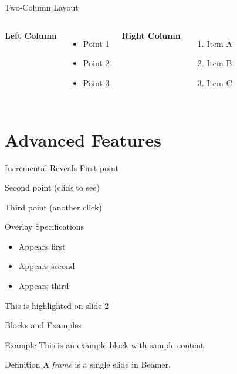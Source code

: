 \documentclass{beamer}
\begin{document}
\begin{frame}{Two-Column Layout}
  \begin{columns}
      \textbf{Left Column}
      \begin{itemize}
        \item Point 1
        \item Point 2
        \item Point 3
      \end{itemize}
    
      \textbf{Right Column}
      \begin{enumerate}
        \item Item A
        \item Item B
        \item Item C
      \end{enumerate}
  \end{columns}
\end{frame}

\section{Advanced Features}

\begin{frame}{Incremental Reveals}
  First point
  \pause
  
  Second point (click to see)
  \pause
  
  Third point (another click)
\end{frame}

\begin{frame}{Overlay Specifications}
  \begin{itemize}
    \item<1-> Appears first
    \item<2-> Appears second
    \item<3-> Appears third
  \end{itemize}
  
  \bigskip
  \alert<2>{This is highlighted on slide 2}
\end{frame}

\begin{frame}{Blocks and Examples}
  \begin{exampleblock}{Example}
    This is an example block with sample content.
  \end{exampleblock}
  
  \begin{block}{Definition}
    A \textit{frame} is a single slide in Beamer.
  \end{block}
\end{frame}
\end{document}

